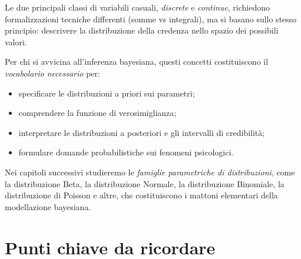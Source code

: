 \documentclass[
  italian,
  letterpaper,
  a4paper,
  11pt,
  open=any]{scrbook}
\providecommand{\tightlist}{%
  \setlength{\itemsep}{0pt}\setlength{\parskip}{0pt}}
\theoremstyle{plain}
\theoremstyle{definition}
\theoremstyle{definition}
\theoremstyle{remark}
\begin{document}
Le due principali classi di variabili casuali, \emph{discrete} e
\emph{continue}, richiedono formalizzazioni tecniche differenti (somme
vs integrali), ma si basano sullo stesso principio: descrivere la
distribuzione della credenza nello spazio dei possibili valori.

Per chi si avvicina all'inferenza bayesiana, questi concetti
costituiscono il \emph{vocabolario necessario} per:

\begin{itemize}
\tightlist
\item
  specificare le distribuzioni a priori sui parametri;
\item
  comprendere la funzione di verosimiglianza;
\item
  interpretare le distribuzioni a posteriori e gli intervalli di
  credibilità;
\item
  formulare domande probabilistiche sui fenomeni psicologici.
\end{itemize}

Nei capitoli successivi studieremo le \emph{famiglie parametriche di
distribuzioni}, come la distribuzione Beta, la distribuzione Normale, la
distribuzione Binomiale, la distribuzione di Poisson e altre, che
costituiscono i mattoni elementari della modellazione bayesiana.

\section*{Punti chiave da ricordare}\label{punti-chiave-da-ricordare-5}

\end{document}
